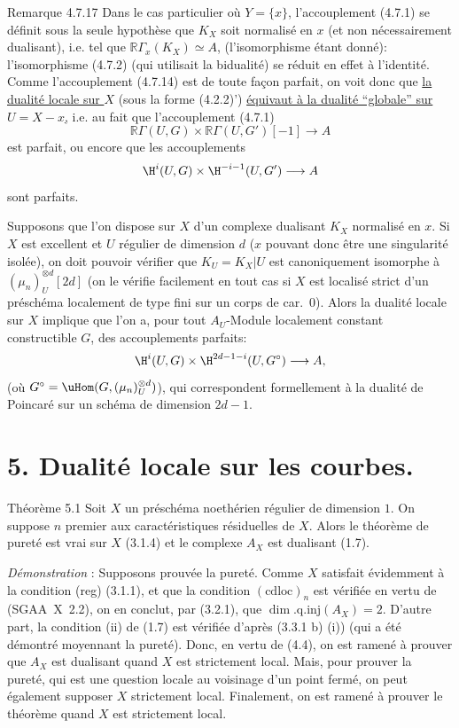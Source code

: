 \begin{statement}{Remarque 4.7.17}
Dans le cas particulier où $Y=\{x\}$, l'accouplement (4.7.1) se définit sous la seule hypothèse que $K_X$ soit normalisé en $x$ (et non nécessairement dualisant), i.e. tel que $\mathbb{R}\Gamma_x(K_X)\simeq A$, (l'isomorphisme étant donné): l'isomorphisme (4.7.2) (qui utilisait la bidualité) se réduit en effet à l'identité. Comme l'accouplement (4.7.14) est de toute façon parfait, on voit donc que \underline{la dualité locale sur $X$} (sous la forme (4.2.2)') \underline{équivaut à la dualité ``globale'' sur $U=X-x$,} i.e. au fait que l'accouplement (4.7.1)
\[
\mathbb{R}\Gamma(U,G)\times\mathbb{R}\Gamma(U,G')[-1]\longrightarrow A
\]
est parfait, ou encore que les accouplements
\[
\H^i(U,G)\times\H^{-i-1}(U,G')\longrightarrow A
\]
sont parfaits.

Supposons que l'on dispose sur $X$ d'un complexe dualisant $K_X$ normalisé en $x$. Si $X$ est excellent et $U$ régulier de dimension $d$ ($x$ pouvant donc être une singularité isolée), on doit pouvoir vérifier que $K_U=K_X|U$ est canoniquement isomorphe à $(\mu_n)_U^{\otimes d}[2d]$ (on le vérifie facilement en tout cas si $X$ est localisé strict d'un préschéma localement de type fini sur un corps de car.~0). Alors la dualité locale sur $X$ implique que l'on a, pour tout $A_U$-Module localement constant constructible $G$, des accouplements parfaits:
\[
\H^i(U,G)\times\H^{2d-1-i}(U,G^\circ)\longrightarrow A,
\]
(où $G^\circ=\uHom(G,(\mu_n)_U^{\otimes d})$), qui correspondent formellement à la dualité de Poincaré sur un schéma de dimension $2d-1$.
\end{statement}

\section*{5. Dualité locale sur les courbes.}

\begin{statement}{Théorème 5.1}
Soit $X$ un préschéma noethérien régulier de dimension $1$. On suppose $n$ premier aux caractéristiques résiduelles de $X$. Alors le théorème de pureté est vrai sur $X$ (3.1.4) et le complexe $A_X$ est dualisant (1.7).
\end{statement}

\emph{Démonstration} : Supposons prouvée la pureté. Comme $X$ satisfait évidemment à la condition (reg) (3.1.1), et que la condition $(\mathrm{cdloc})_n$ est vérifiée en vertu de (SGAA~X~2.2), on en conclut, par (3.2.1), que $\dim.\mathrm{q.inj}(A_X)=2$. D'autre part, la condition (ii) de (1.7) est vérifiée d'après (3.3.1 b) (i)) (qui a été démontré moyennant la pureté). Donc, en vertu de (4.4), on est ramené à prouver que $A_X$ est dualisant quand $X$ est strictement local. Mais, pour prouver la pureté, qui est une question locale au voisinage d'un point fermé, on peut également supposer $X$ strictement local. Finalement, on est ramené à prouver le théorème quand $X$ est strictement local.

